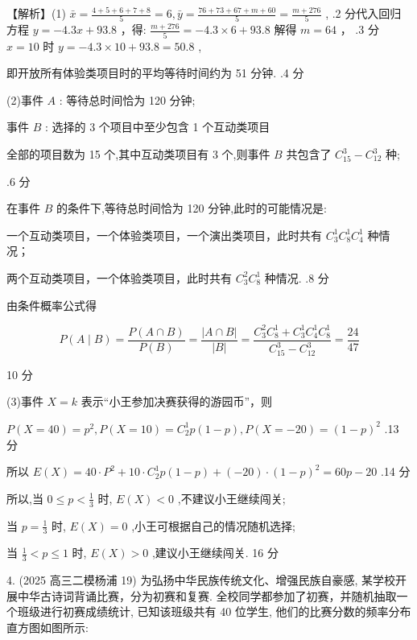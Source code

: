 \documentclass[10pt]{article}
\newcommand*\circled[1]{\tikz[baseline=(char.base)]{\node[shape=circle,draw,inner sep=1.5pt] (char) {\small #1};}}
\begin{document}
【解析】(1) \(\bar{x} = \frac{4 + 5 + 6 + 7 + 8}{5} = 6,\bar{y} = \frac{{76} + {73} + {67} + m + {60}}{5} = \frac{m + {276}}{5}\) , .2 分代入回归方程 \(y =  - {4.3x} + {93.8}\) ，得: \(\frac{m + {276}}{5} =  - {4.3} \times  6 + {93.8}\) 解得 \(m = {64}\) ， .3 分 \(x = {10}\) 时 \(y =  - {4.3} \times  {10} + {93.8} = {50.8}\) ,

即开放所有体验类项目时的平均等待时间约为 51 分钟. .4 分

(2)事件 \(A\) : 等待总时间恰为 120 分钟;

事件 \(B\) : 选择的 3 个项目中至少包含 1 个互动类项目

全部的项目数为 15 个,其中互动类项目有 3 个,则事件 \(B\) 共包含了 \({C}_{15}^{3} - {C}_{12}^{3}\) 种;

.6 分

在事件 \(B\) 的条件下,等待总时间恰为 120 分钟,此时的可能情况是:

 \circled{1} 一个互动类项目，一个体验类项目，一个演出类项目，此时共有 \({C}_{3}^{1}{C}_{8}^{1}{C}_{4}^{1}\) 种情况；

 \circled{2} 两个互动类项目，一个体验类项目，此时共有 \({C}_{3}^{2}{C}_{8}^{1}\) 种情况. .8 分

由条件概率公式得

\[
P\left( {A \mid  B}\right)  = \frac{P\left( {A \cap  B}\right) }{P\left( B\right) } = \frac{\left| A \cap  B\right| }{\left| B\right| } = \frac{{C}_{3}^{2}{C}_{8}^{1} + {C}_{3}^{1}{C}_{4}^{1}{C}_{8}^{1}}{{C}_{15}^{3} - {C}_{12}^{3}} = \frac{24}{47}
\]

10 分

(3)事件 \(X = k\) 表示“小王参加决赛获得的游园币”，则

\(P\left( {X = {40}}\right)  = {p}^{2},P\left( {X = {10}}\right)  = {C}_{2}^{1}p\left( {1 - p}\right) ,P\left( {X =  - {20}}\right)  = {\left( 1 - p\right) }^{2}\) .13 分

所以 \(E\left( X\right)  = {40} \cdot  {P}^{2} + {10} \cdot  {C}_{2}^{1}p\left( {1 - p}\right)  + \left( {-{20}}\right)  \cdot  {\left( 1 - p\right) }^{2} = {60p} - {20}\) .14 分

所以,当 \(0 \leq  p < \frac{1}{3}\) 时, \(E\left( X\right)  < 0\) ,不建议小王继续闯关;

当 \(p = \frac{1}{3}\) 时, \(E\left( X\right)  = 0\) ,小王可根据自己的情况随机选择;

当 \(\frac{1}{3} < p \leq  1\) 时, \(E\left( X\right)  > 0\) ,建议小王继续闯关. 16 分

4. (2025 高三二模杨浦 19) 为弘扬中华民族传统文化、增强民族自豪感, 某学校开展中华古诗词背诵比赛，分为初赛和复赛. 全校同学都参加了初赛，并随机抽取一个班级进行初赛成绩统计, 已知该班级共有 40 位学生, 他们的比赛分数的频率分布直方图如图所示:
\end{document}
